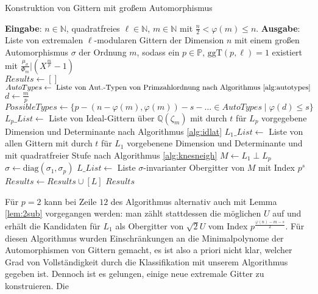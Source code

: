 \documentclass[12pt,a4paper,halfparskip,headsepline,bibtotocnumbered]{scrreprt}
\theoremstyle{nummermitklammern}
\theoremstyle{nonumberbreak}
\newcommand{\N}{\mathbb{N}}
\newcommand{\Q}{\mathbb{Q}}
\renewcommand{\P}{\mathbb{P}}
\newcommand{\ggT}{\text{ggT}}
\begin{document}
\begin{algorithm}[H]
	\caption{Konstruktion von Gittern mit großem Automorphismus}\label{alg:largeauto}
	\begin{algorithmic}[1]
		\State \textbf{Eingabe}: $n \in \N$, quadratfreies $\ell \in \N$, $m \in \N$ mit $\frac{n}{2} < \varphi(m) \leq n$.
		\State \textbf{Ausgabe}: Liste von extremalen $\ell$-modularen Gittern der Dimension $n$ mit einem großen Automorphismus $\sigma$ der Ordnung $m$, sodass ein $p \in \P$, $\ggT(p, \ell) = 1$ existiert mit $\frac{\mu_\sigma}{\Phi_m} \vert (X^\frac{m}{p}-1)$
		\\
		\State $Results \gets []$
		\State $AutoTypes \gets \text{ Liste von Aut.-Typen von Primzahlordnung nach Algorithmus \eqref{alg:autotypes}}$
		\For {$p \in \lbrace q \in \P \mid q \vert m, \ggT(q, \ell) > 1 \rbrace$}
			\State $d \gets \frac{m}{p}$
			\State $PossibleTypes \gets \lbrace p - (n - \varphi(m), \varphi(m)) - s - \dots \in AutoTypes \mid \varphi(d) \leq s \rbrace$
				\State $L_p\_List \gets$ Liste von Ideal-Gittern über $\Q(\zeta_m)$ mit durch $t$ für $L_p$ vorgegebene Dimension und Determinante nach Algorithmus \eqref{alg:idlat}
					\State $L_1\_List \gets$ Liste von allen Gittern mit durch $t$ für $L_1$ vorgebenene Dimension und Determinante und mit quadratfreier Stufe nach Algorithmus \eqref{alg:knesneigh}
								\State $M \gets L_1 \perp L_p$
								\State $\sigma \gets \text{diag}(\sigma_1, \sigma_p)$
								\State $L\_List \gets$ Liste $\sigma$-invarianter Obergitter von $M$ mit Index $p^s$
										\State $Results \gets Results \cup [L]$							
									\EndIf
								\EndFor
							\EndFor
						\EndFor
					\EndFor
				\EndFor
			\EndFor
		\EndFor
		\State \Return $Results$
	\end{algorithmic}
\end{algorithm}

Für $p = 2$ kann bei Zeile $12$ des Algorithmus alternativ auch mit Lemma \eqref{lem:2sub} vorgegangen werden: man zählt stattdessen die möglichen $U$ auf und erhält die Kandidaten für $L_1$ als Obergitter von $\sqrt{2} U$ vom Index $p^\frac{\varphi(n)-m - s}{2}$.
Für diesen Algorithmus wurden Einschränkungen an die Minimalpolynome der Automorphismen von Gittern gemacht, es ist also a priori nicht klar, welcher Grad von Vollständigkeit durch die Klassifikation mit unserem Algorithmus gegeben ist. Dennoch ist es gelungen, einige neue extremale Gitter zu konstruieren. Die 
\end{document}
